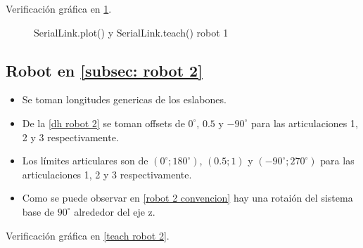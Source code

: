\documentclass[a4paper,12pt]{article}
\begin{document}
Verificación gráfica en \cref{teach robot 1}.

\begin{figure}[H]
    \centering
    \begin{adjustbox}{max width=\columnwidth}
    \end{adjustbox}
    \caption{SerialLink.plot() y SerialLink.teach() robot 1}
    \label{teach robot 1}
\end{figure}

\subsection{Robot en \cref{subsec: robot 2}}
\begin{itemize}
    \item Se toman longitudes genericas de los eslabones.
    \item De la \cref{dh robot 2} se toman offsets de $0^\circ$, $0.5$ y $-90^\circ$ para las articulaciones 1, 2 y 3 respectivamente.
    \item Los límites articulares son de $\left(0^\circ; 180^\circ\right)$, $\left(0.5; 1\right)$ y $\left(-90^\circ; 270^\circ\right)$ para las articulaciones 1, 2 y 3 respectivamente.
    \item Como se puede observar en \cref{robot 2 convencion} hay una rotaión del sistema base de $90^\circ$ alrededor del eje z.
\end{itemize}

Verificación gráfica en \cref{teach robot 2}.
\end{document}
